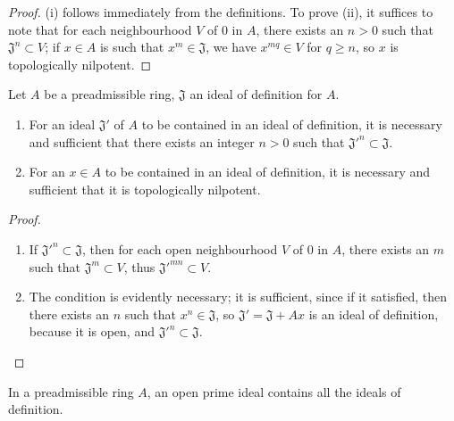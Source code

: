 \begin{proof}
(i) follows immediately from the definitions. To prove (ii), it suffices to note that for
each neighbourhood $V$ of $0$ in $A$, there exists an $n>0$ such that
$\mathfrak{J}^n\subset V$; if $x\in A$ is such that $x^m\in\mathfrak{J}$, we have
$x^{mq}\in V$ for $q\geq n$, so $x$ is topologically nilpotent.
\end{proof}

\begin{proposition}[7.1.4]
\label{0.7.1.4}
Let $A$ be a preadmissible ring, $\mathfrak{J}$ an ideal of definition for $A$.
\begin{enumerate}
  \item[{\rm(i)}] For an ideal $\mathfrak{J}'$ of $A$ to be contained in an ideal of
    definition, it is necessary and sufficient that there exists an integer
    $n>0$ such that ${\mathfrak{J}'}^n\subset\mathfrak{J}$.
  \item[{\rm(ii)}] For an $x\in A$ to be contained in an ideal of definition, it is
    necessary and sufficient that it is topologically nilpotent.
\end{enumerate}
\end{proposition}

\begin{proof}
\medskip\noindent
\begin{enumerate}
  \item[(i)] If ${\mathfrak{J}'}^n\subset\mathfrak{J}$, then for each open neighbourhood
    $V$ of $0$ in $A$, there exists an $m$ such that $\mathfrak{J}^m\subset V$, thus
    ${\mathfrak{J}'}^{mn}\subset V$.
  \item[(ii)] The condition is evidently necessary; it is sufficient, since if it
    satisfied, then there exists an $n$ such that $x^n\in\mathfrak{J}$, so
    $\mathfrak{J}'=\mathfrak{J}+Ax$ is an ideal of definition, because it is
    open, and ${\mathfrak{J}'}^n\subset\mathfrak{J}$.
\end{enumerate}
\end{proof}

\begin{corollary}[7.1.5]
\label{0.7.1.5}
In a preadmissible ring $A$, an open prime ideal contains all the ideals of definition.
\end{corollary}

